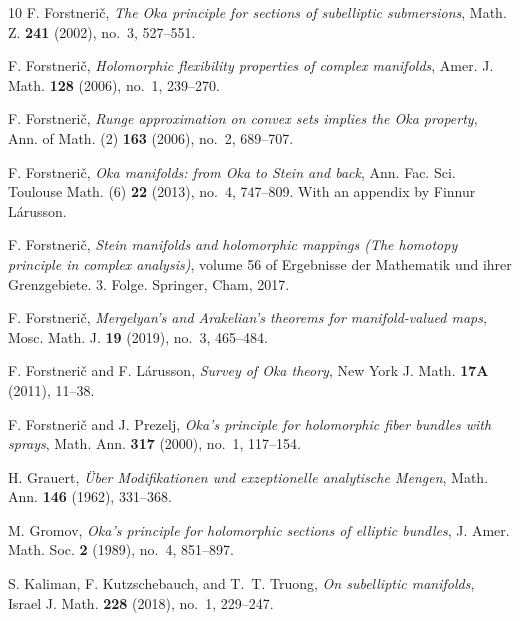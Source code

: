 \documentclass[12pt]{amsart}
\theoremstyle{definition}
\numberwithin{equation}{section}
\numberwithin{figure}{section}
\numberwithin{equation}{section}
\begin{document}
\begin{thebibliography}{10}
F. Forstneri\v{c},
\newblock \emph{The Oka principle for sections of subelliptic submersions},
\newblock Math. Z. \textbf{241} (2002), no.~3, 527--551.

F. Forstneri\v{c},
\newblock \emph{Holomorphic flexibility properties of complex manifolds},
\newblock Amer. J. Math. \textbf{128} (2006), no.~1, 239--270.

F. Forstneri\v{c},
\newblock \emph{Runge approximation on convex sets implies the Oka property},
\newblock Ann. of Math. (2) \textbf{163} (2006), no.~2, 689--707.

F. Forstneri\v{c},
\newblock \emph{Oka manifolds: from Oka to Stein and back},
\newblock Ann. Fac. Sci. Toulouse Math. (6) \textbf{22} (2013), no.~4, 747--809.
With an appendix by Finnur L\'arusson.

\enlargethispage{1em}
F. Forstneri\v{c},
\newblock \emph{Stein manifolds and holomorphic mappings (The homotopy principle in complex analysis)},
\newblock volume 56 of Ergebnisse der Mathematik und ihrer Grenzgebiete. 3. Folge. Springer, Cham, 2017.

F. Forstneri\v{c},
\newblock \emph{Mergelyan's and Arakelian's theorems for manifold-valued maps},
\newblock Mosc. Math. J. \textbf{19} (2019), no.~3, 465--484.

F. Forstneri\v{c} and F. L\'arusson,
\newblock \emph{Survey of Oka theory},
\newblock New York J. Math. \textbf{17A} (2011), 11--38.

F. Forstneri\v{c} and J. Prezelj,
\newblock \emph{Oka's principle for holomorphic fiber bundles with sprays},
\newblock Math. Ann. \textbf{317} (2000), no.~1, 117--154.

H. Grauert,
\newblock \emph{\"Uber Modifikationen und exzeptionelle analytische Mengen},
\newblock Math. Ann. \textbf{146} (1962), 331--368.

M. Gromov,
\newblock \emph{Oka's principle for holomorphic sections of elliptic bundles},
\newblock J. Amer. Math. Soc. \textbf{2} (1989), no.~4, 851--897.

S. Kaliman, F. Kutzschebauch, and T.~T. Truong,
\newblock \emph{On subelliptic manifolds},
\newblock Israel J. Math. \textbf{228} (2018), no.~1, 229--247.


\end{thebibliography}
\end{document}
